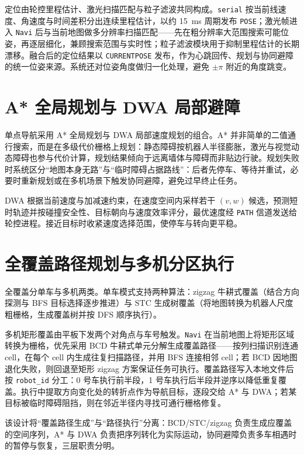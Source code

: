 定位由轮控里程估计、激光扫描匹配与粒子滤波共同构成。\texttt{serial} 按当前线速度、角速度与时间差积分出连续里程估计，以约 15~ms 周期发布 \texttt{POSE}；激光帧进入 \texttt{Navi} 后与当前地图做多分辨率扫描匹配——先在粗分辨率大范围搜索可能位姿，再逐层细化，兼顾搜索范围与实时性；粒子滤波模块用于抑制里程估计的长期漂移。融合后的定位结果以 \texttt{CURRENTPOSE} 发布，作为心跳回传、规划与协同避障的统一位姿来源。系统还对位姿角度做归一化处理，避免 $\pm\pi$ 附近的角度跳变。

\section{A* 全局规划与 DWA 局部避障}
\label{sec:astar-dwa}

单点导航采用 A* 全局规划与 DWA 局部速度规划的组合。A* 并非简单的二值通行搜索，而是在多级代价栅格上规划：静态障碍按机器人半径膨胀，激光与视觉动态障碍也参与代价计算，规划结果倾向于远离墙体与障碍而非贴边行驶。规划失败时系统区分“地图本身无路”与“临时障碍占据路线”：后者先停车、等待并重试，必要时重新规划或在多机场景下触发协同避障，避免过早终止任务。

DWA 根据当前速度与加减速约束，在速度空间内采样若干 $(v,w)$ 候选，预测短时轨迹并按碰撞安全性、目标朝向与速度效率评分，最优速度经 \texttt{PATH} 信道发送给轮控进程。接近目标时收紧速度选择范围，使停车与转向更平稳。

\section{全覆盖路径规划与多机分区执行}
\label{sec:coverage}

全覆盖分单车与多机两类。单车模式支持两种算法：zigzag 牛耕式覆盖（结合方向探测与 BFS 目标选择逐步推进）与 STC 生成树覆盖（将地图转换为机器人尺度粗栅格，生成覆盖树并按 DFS 顺序执行）。

多机矩形覆盖由平板下发两个对角点与车号触发。\texttt{Navi} 在当前地图上将矩形区域转换为栅格，优先采用 BCD 牛耕式单元分解生成覆盖路径——按列扫描识别连通 cell，在每个 cell 内生成往复扫描路径，并用 BFS 连接相邻 cell；若 BCD 因地图退化失败，则回退至矩形 zigzag 方案保证任务可执行。覆盖路径写入本地文件后按 \texttt{robot\_id} 分工：0 号车执行前半段，1 号车执行后半段并逆序以降低重复覆盖。执行中提取方向变化处的转折点作为导航目标，逐段交给 A* 与 DWA；若某目标被临时障碍阻挡，则在邻近半径内寻找可通行栅格修复。

该设计将“覆盖路径生成”与“路径执行”分离：BCD/STC/zigzag 负责生成应覆盖的空间序列，A* 与 DWA 负责把序列转化为实际运动，协同避障负责多车相遇时的暂停与恢复，三层职责分明。

